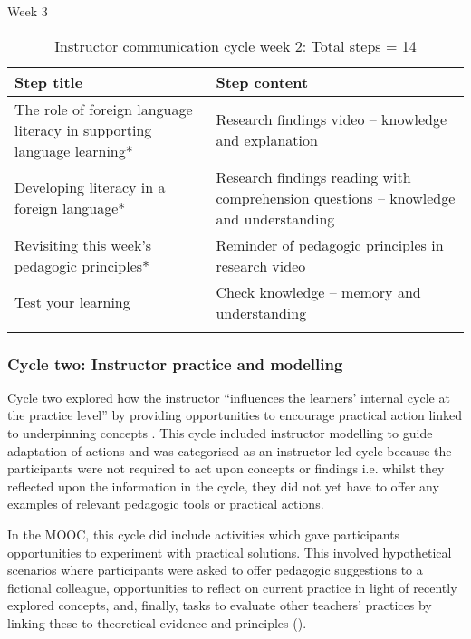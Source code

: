 \documentclass[output=paper]{langscibook}
\begin{document}
\begin{table}
\ContinuedFloat
\begin{subtable}{\textwidth}
\caption{Week 3}
\label{tab:porter:2c}
\begin{tabularx}{\textwidth}{QQ}
\lsptoprule
{Step title} & {Step content}\\
\midrule
 The role of foreign language literacy in supporting language learning* &  Research findings video -- knowledge and explanation\\
 \tablevspace
 Developing literacy in a foreign language* &  Research findings reading with comprehension questions -- knowledge and understanding\\
 \tablevspace
 Revisiting this week’s pedagogic principles* &  Reminder of pedagogic principles in research video\\
 \tablevspace
 Test your learning & Check knowledge -- memory and understanding\\
\lspbottomrule
\end{tabularx}
\end{subtable}
\caption{Instructor communication cycle week 2: Total steps = 14}
\end{table}

\subsubsection{Cycle two: Instructor practice and modelling}\label{sec:porter:2.1.2}

Cycle two explored how the instructor ``influences the learners’ internal cycle at the practice level'' by providing opportunities to encourage practical action linked to underpinning concepts \citep[89]{Laurillard2012}. This cycle included instructor modelling to guide adaptation of actions and was categorised as an instructor-led cycle because the participants were not required to act upon concepts or findings i.e. whilst they reflected upon the information in the cycle, they did not yet have to offer any examples of relevant pedagogic tools or practical actions.

In the MOOC, this cycle did include activities which gave participants opportunities to experiment with practical solutions. This involved hypothetical scenarios where participants were asked to offer pedagogic suggestions to a fictional colleague, opportunities to reflect on current practice in light of recently explored concepts, and, finally, tasks to evaluate other teachers’ practices by linking these to theoretical evidence and principles ().
\end{document}
